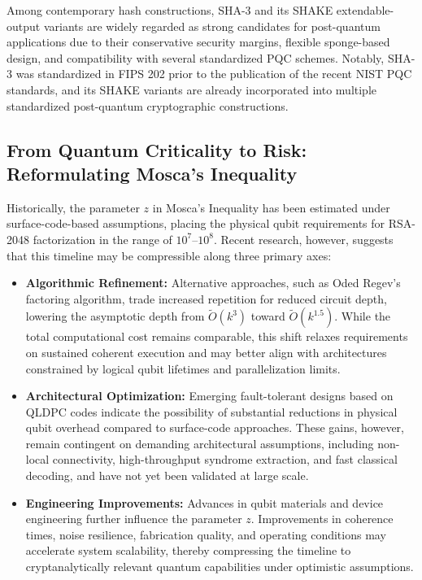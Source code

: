\documentclass[11pt,a4paper]{article}
\begin{document}
Among contemporary hash constructions, SHA-3 and its SHAKE extendable-output variants are widely regarded as strong candidates for post-quantum applications due to their conservative security margins, flexible sponge-based design, and compatibility with several standardized PQC schemes. Notably, SHA-3 was standardized in FIPS 202 prior to the publication of the recent NIST PQC standards, and its SHAKE variants are already incorporated into multiple standardized post-quantum cryptographic constructions.\cite{nist202}
\subsection{From Quantum Criticality to Risk: Reformulating Mosca’s Inequality}

Historically, the parameter $z$ in Mosca’s Inequality has been estimated under surface-code-based assumptions, placing the physical qubit requirements for RSA-2048 factorization in the range of $10^7$--$10^8$. Recent research, however, suggests that this timeline may be compressible along three primary axes:

\begin{itemize}[leftmargin=*]

\item \textbf{Algorithmic Refinement:} Alternative approaches, such as Oded Regev’s factoring algorithm, trade increased repetition for reduced circuit depth, lowering the asymptotic depth from $\tilde{O}(k^3)$ toward $\tilde{O}(k^{1.5})$. While the total computational cost remains comparable, this shift relaxes requirements on sustained coherent execution and may better align with architectures constrained by logical qubit lifetimes and parallelization limits.

\item \textbf{Architectural Optimization:} Emerging fault-tolerant designs based on QLDPC codes indicate the possibility of substantial reductions in physical qubit overhead compared to surface-code approaches. These gains, however, remain contingent on demanding architectural assumptions, including non-local connectivity, high-throughput syndrome extraction, and fast classical decoding, and have not yet been validated at large scale.

\item \textbf{Engineering Improvements:} Advances in qubit materials and device engineering further influence the parameter $z$. Improvements in coherence times, noise resilience, fabrication quality, and operating conditions may accelerate system scalability, thereby compressing the timeline to cryptanalytically relevant quantum capabilities under optimistic assumptions.

\end{itemize}
\end{document}
